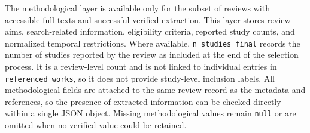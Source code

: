 The methodological layer is available only for the subset of reviews with accessible full texts and successful verified extraction. This layer stores review aims, search-related information, eligibility criteria, reported study counts, and normalized temporal restrictions. Where available, \texttt{n\_studies\_final} records the number of studies reported by the review as included at the end of the selection process. It is a review-level count and is not linked to individual entries in \texttt{referenced\_works}, so it does not provide study-level inclusion labels. All methodological fields are attached to the same review record as the metadata and references, so the presence of extracted information can be checked directly within a single JSON object. Missing methodological values remain \texttt{null} or are omitted when no verified value could be retained.




